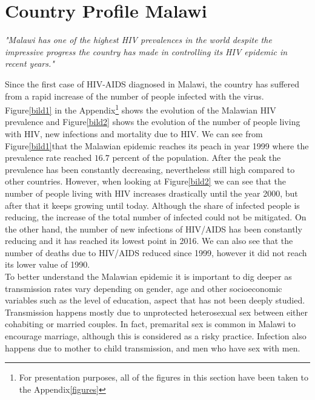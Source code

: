 \section{Country Profile Malawi}\label{sec3}
\begin{center}
\textit{"Malawi has one of the highest HIV prevalences in the world despite the impressive progress the country has made in controlling its HIV epidemic in recent years."\cite{report1}}
\end{center}

Since the first case of HIV-AIDS diagnosed in Malawi, the country has suffered from a rapid increase of the number of people infected with the virus. Figure\ref{bild1} in the Appendix\footnote{For presentation purposes, all of the figures in this section have been taken to the Appendix\ref{figures}} shows the evolution of the Malawian HIV prevalence and Figure\ref{bild2} shows the evolution of the number of people living with HIV, new infections and mortality due to HIV. We can see from Figure\ref{bild1}that the Malawian epidemic reaches its peach in year 1999 where the prevalence rate reached $16.7$ percent of the population. After the peak the prevalence has been constantly decreasing, nevertheless still high compared to other countries. However, when looking at Figure\ref{bild2} we can see that the number of people living with HIV increases drastically until the year 2000, but after that it keeps growing until today.  Although the share of infected people is reducing, the increase of the total number of infected could not be mitigated. On the other hand, the number of new infections of HIV/AIDS has been constantly reducing and it has reached its lowest point in 2016. We can also see that the number of deaths due to HIV/AIDS reduced since 1999, however it did not reach its lower value of 1990.\\    


To better understand the Malawian epidemic it is important to dig deeper as transmission rates vary depending on gender, age and other socioeconomic variables such as the level of education, aspect that has not been deeply studied. Transmission happens mostly due to unprotected heterosexual sex between either cohabiting or married couples. In fact, premarital sex is common in Malawi to encourage marriage, although this is considered as a risky practice. Infection also happens due to mother to child transmission, and men who have sex with men.  \\

